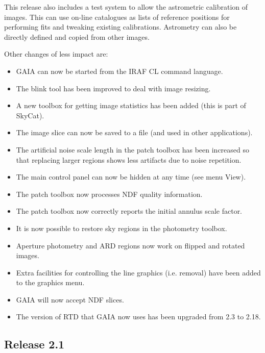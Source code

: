 \documentclass[twoside,11pt]{article}
\renewcommand{\_}{\texttt{\symbol{95}}}
\begin{document}
This release also includes a test system to allow the astrometric
calibration of images. This can use on-line catalogues as lists of
reference positions for performing fits and tweaking existing
calibrations.  Astrometry can also be directly defined and copied from
other images.


Other changes of less impact are:
\begin{itemize}
\item GAIA can now be started from the IRAF CL command language.
\item The blink tool has been improved to deal with image resizing.
\item A new toolbox for getting image statistics has been added (this
is part of SkyCat).
\item The image slice can now be saved to a file (and used in other
applications).
\item The artificial noise scale length in the patch toolbox has been
increased so that replacing larger regions shows less artifacts due to
noise repetition.
\item The main control panel can now be hidden at any time (see menu View).
\item The patch toolbox now processes NDF quality information.
\item The patch toolbox now correctly reports the initial annulus scale factor.
\item It is now possible to restore sky regions in the photometry toolbox.
\item Aperture photometry and ARD regions now work on flipped and
rotated images.
\item Extra facilities for controlling the line graphics (i.e. removal)
have been added to the graphics menu.
\item GAIA will now accept NDF slices.
\item The version of RTD that GAIA now uses has been upgraded from
      2.3 to 2.18.
\end{itemize}

\subsection{Release 2.1}
\end{document}
